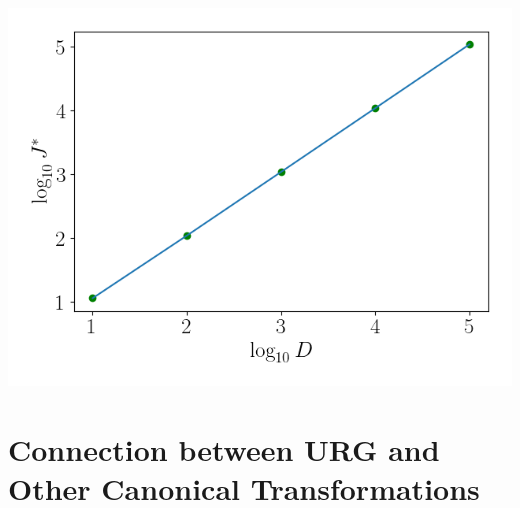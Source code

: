 \documentclass[twoside]{report}
\numberwithin{equation}{section}
\begin{document}
\begin{center}
	\includegraphics[scale=0.5]{../kondo_num/JvsD.png}
	\label{JvsD-kondo}
\end{center}

\chapter{Connection between URG and Other Canonical Transformations}
\label{urg_canonical}
\end{document}
